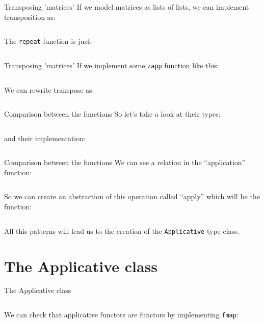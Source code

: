 \documentclass[10pt]{beamer}
\begin{document}
\begin{frame}{Transposing 'matrices'}
  If we model matrices as lists of lists, we can implement
  transposition as:

  \inputminted{haskell}{./src/transpose.hs}

  The \verb~repeat~ function is just:

  \inputminted{haskell}{./src/repeat.hs}
\end{frame}

\begin{frame}{Transposing 'matrices'}
  If we implement some \verb~zapp~ function like this:

  \inputminted{haskell}{./src/zapp.hs}

  We can rewrite transpose as:

  \inputminted{haskell}{./src/transpose1.hs}
\end{frame}

\begin{frame}{Comparison between the functions}
  So let's take a look at their types:

  \inputminted{haskell}{./src/comparison_types.hs}

  and their implementation:

  \inputminted{haskell}{./src/comparison_impl.hs}
\end{frame}

\begin{frame}{Comparison between the functions}
  We can see a relation in the ``application'' function:

  \inputminted{haskell}{./src/comparison_types_ap.hs}

  So we can create an abstraction of this operation called ``apply''
  which will be the function:

  \inputminted{haskell}{./src/apply_type.hs}

  All this patterns will lead us to the creation of the
  \verb~Applicative~ type class.
\end{frame}

\section{The Applicative class}

\begin{frame}{The Applicative class}

  \inputminted{haskell}{./src/applicative.hs}

  We can check that applicative functors are functors by implementing
  \verb~fmap~:

  \inputminted{haskell}{./src/fmap.hs}
\end{frame}
\end{document}
